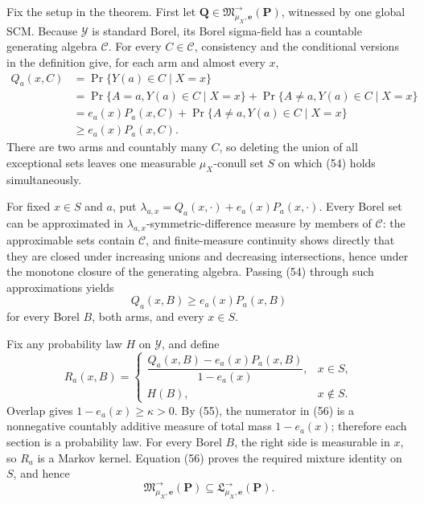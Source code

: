 Fix the setup in the theorem.  First let \(\boldsymbol Q\in\mathfrak M^{\to}_{\mu_X,\boldsymbol e}(\boldsymbol P)\), witnessed by one global SCM.  Because \(\mathcal Y\) is standard Borel, its Borel sigma-field has a countable generating algebra \(\mathcal C\).  For every \(C\in\mathcal C\), consistency and the conditional versions in the definition give, for each arm and almost every \(x\),
\[
 \begin{aligned}
 Q_a(x,C)
 &=\Pr\{Y(a)\in C\mid X=x\}\\
 &=\Pr\{A=a,Y(a)\in C\mid X=x\}
   +\Pr\{A\ne a,Y(a)\in C\mid X=x\}\\
 &=e_a(x)P_a(x,C)
   +\Pr\{A\ne a,Y(a)\in C\mid X=x\}\\
 &\ge e_a(x)P_a(x,C).
 \end{aligned} \tag{54}
\]
There are two arms and countably many \(C\), so deleting the union of all exceptional sets leaves one measurable \(\mu_X\)-conull set \(S\) on which (54) holds simultaneously.

For fixed \(x\in S\) and \(a\), put \(\lambda_{a,x}=Q_a(x,\cdot)+e_a(x)P_a(x,\cdot)\).  Every Borel set can be approximated in \(\lambda_{a,x}\)-symmetric-difference measure by members of \(\mathcal C\): the approximable sets contain \(\mathcal C\), and finite-measure continuity shows directly that they are closed under increasing unions and decreasing intersections, hence under the monotone closure of the generating algebra.  Passing (54) through such approximations yields
\[
 Q_a(x,B)\ge e_a(x)P_a(x,B) \tag{55}
\]
for every Borel \(B\), both arms, and every \(x\in S\).

Fix any probability law \(H\) on \(\mathcal Y\), and define
\[
 R_a(x,B)=
 \begin{cases}
 \dfrac{Q_a(x,B)-e_a(x)P_a(x,B)}{1-e_a(x)},&x\in S,\\[6pt]
 H(B),&x\notin S.
 \end{cases} \tag{56}
\]
Overlap gives \(1-e_a(x)\ge\kappa>0\).  By (55), the numerator in (56) is a nonnegative countably additive measure of total mass \(1-e_a(x)\); therefore each section is a probability law.  For every Borel \(B\), the right side is measurable in \(x\), so \(R_a\) is a Markov kernel.  Equation (56) proves the required mixture identity on \(S\), and hence
\[
 \mathfrak M^{\to}_{\mu_X,\boldsymbol e}(\boldsymbol P)
 \subseteq\mathfrak L^{\to}_{\mu_X,\boldsymbol e}(\boldsymbol P). \tag{57}
\]

